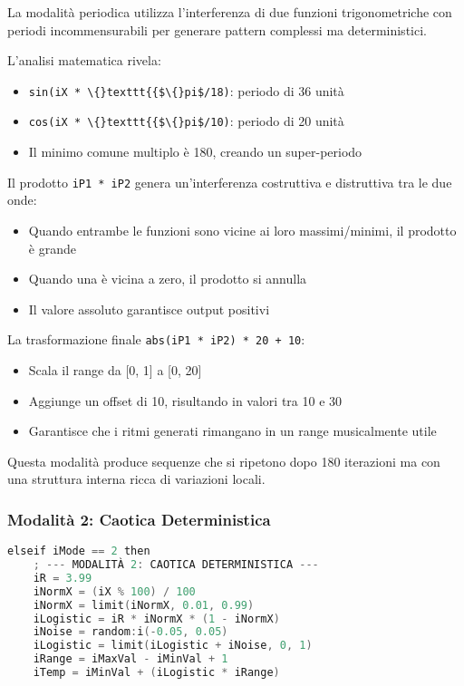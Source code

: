La modalità periodica utilizza l'interferenza di due funzioni trigonometriche con periodi incommensurabili per generare pattern complessi ma deterministici.

L'analisi matematica rivela:
\begin{itemize}
    \item \texttt{sin(iX * \textbackslash\{\}texttt\{\{\$\textbackslash\{\}pi\$/18)}: periodo di 36 unità
    \item \texttt{cos(iX * \textbackslash\{\}texttt\{\{\$\textbackslash\{\}pi\$/10)}: periodo di 20 unità
    \item Il minimo comune multiplo è 180, creando un super-periodo
\end{itemize}

Il prodotto \texttt{iP1 * iP2} genera un'interferenza costruttiva e distruttiva tra le due onde:
\begin{itemize}
    \item Quando entrambe le funzioni sono vicine ai loro massimi/minimi, il prodotto è grande
    \item Quando una è vicina a zero, il prodotto si annulla
    \item Il valore assoluto garantisce output positivi
\end{itemize}

La trasformazione finale \texttt{abs(iP1 * iP2) * 20 + 10}:
\begin{itemize}
    \item Scala il range da [0, 1] a [0, 20]
    \item Aggiunge un offset di 10, risultando in valori tra 10 e 30
    \item Garantisce che i ritmi generati rimangano in un range musicalmente utile
\end{itemize}

Questa modalità produce sequenze che si ripetono dopo 180 iterazioni ma con una struttura interna ricca di variazioni locali.
\subsubsection{Modalità 2: Caotica Deterministica}
\begin{lstlisting}[language=C]
elseif iMode == 2 then
    ; --- MODALITÀ 2: CAOTICA DETERMINISTICA ---
    iR = 3.99
    iNormX = (iX % 100) / 100
    iNormX = limit(iNormX, 0.01, 0.99)
    iLogistic = iR * iNormX * (1 - iNormX)
    iNoise = random:i(-0.05, 0.05)
    iLogistic = limit(iLogistic + iNoise, 0, 1)
    iRange = iMaxVal - iMinVal + 1
    iTemp = iMinVal + (iLogistic * iRange)
\end{lstlisting}

